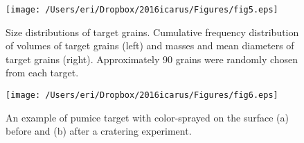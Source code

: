 \documentclass[3p,authoryear]{elsarticle}
\begin{document}
\begin{figure*}[tbp]
	\begin{center}
	\texttt{[image: /Users/eri/Dropbox/2016icarus/Figures/fig5.eps]}
	\caption{Size distributions of target grains. Cumulative frequency distribution of volumes of target grains (left) and masses and mean diameters of target grains (right). Approximately 90 grains were randomly chosen from each target.}
	\label{grainsize-CDF}
	\end{center}
\end{figure*}


\begin{figure}[htbp]
	\begin{center}
	\texttt{[image: /Users/eri/Dropbox/2016icarus/Figures/fig6.eps]}
	\caption{An example of pumice target with color-sprayed on the surface (a) before and (b) after a cratering experiment.}
	\label{crater-splay}
	\end{center}
\end{figure}

\end{document}
